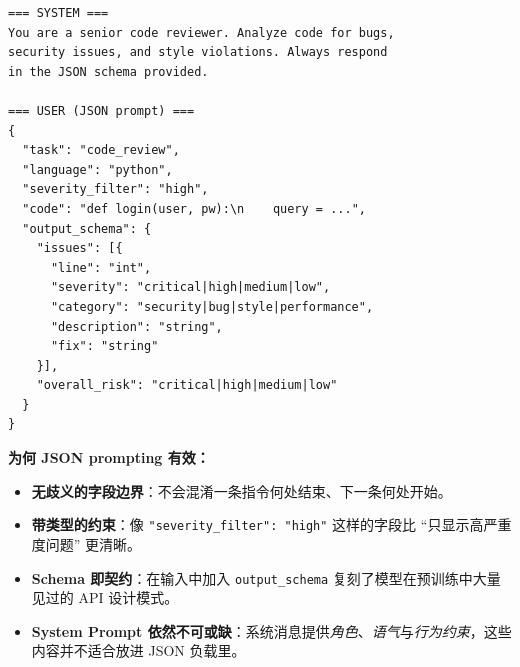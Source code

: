 \begin{examplebox}
\begin{lstlisting}
=== SYSTEM ===
You are a senior code reviewer. Analyze code for bugs,
security issues, and style violations. Always respond
in the JSON schema provided.

=== USER (JSON prompt) ===
{
  "task": "code_review",
  "language": "python",
  "severity_filter": "high",
  "code": "def login(user, pw):\n    query = ...",
  "output_schema": {
    "issues": [{
      "line": "int",
      "severity": "critical|high|medium|low",
      "category": "security|bug|style|performance",
      "description": "string",
      "fix": "string"
    }],
    "overall_risk": "critical|high|medium|low"
  }
}
\end{lstlisting}

\textbf{为何 JSON prompting 有效：}

\begin{itemize}
  \item \textbf{无歧义的字段边界}：不会混淆一条指令何处结束、下一条何处开始。
  \item \textbf{带类型的约束}：像 \texttt{"severity\_filter": "high"} 这样的字段比 ``只显示高严重度问题'' 更清晰。
  \item \textbf{Schema 即契约}：在输入中加入 \texttt{output\_schema} 复刻了模型在预训练中大量见过的 API 设计模式。
  \item \textbf{System Prompt 依然不可或缺}：系统消息提供\emph{角色}、\emph{语气}与\emph{行为约束}，这些内容并不适合放进 JSON 负载里。
\end{itemize}
\end{examplebox}

